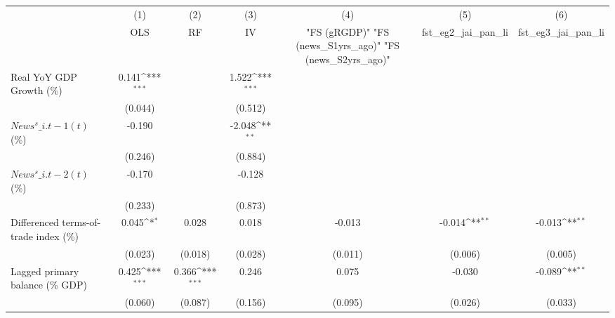 {
\def\sym#1{\ifmmode^{#1}\else\(^{#1}\)\fi}
\begin{tabular}{l*{6}{c}}
\toprule
                    &\multicolumn{1}{c}{(1)}&\multicolumn{1}{c}{(2)}&\multicolumn{1}{c}{(3)}&\multicolumn{1}{c}{(4)}&\multicolumn{1}{c}{(5)}&\multicolumn{1}{c}{(6)}\\
                    &\multicolumn{1}{c}{OLS}&\multicolumn{1}{c}{RF}&\multicolumn{1}{c}{IV}&\multicolumn{1}{c}{ "FS (gRGDP)"  "FS (news\_S1yrs\_ago)"  "FS (news\_S2yrs\_ago)" }&\multicolumn{1}{c}{fst\_eg2\_jai\_pan\_li}&\multicolumn{1}{c}{fst\_eg3\_jai\_pan\_li}\\
\midrule
Real YoY GDP Growth (\%)&       0.141\sym{***}&                     &       1.522\sym{***}&                     &                     &                     \\
                    &     (0.044)         &                     &     (0.512)         &                     &                     &                     \\
\addlinespace
$ News^s\_{i.t-1}(t)$ (\%)&      -0.190         &                     &      -2.048\sym{**} &                     &                     &                     \\
                    &     (0.246)         &                     &     (0.884)         &                     &                     &                     \\
\addlinespace
$ News^s\_{i.t-2}(t)$ (\%)&      -0.170         &                     &      -0.128         &                     &                     &                     \\
                    &     (0.233)         &                     &     (0.873)         &                     &                     &                     \\
\addlinespace
Differenced terms-of-trade index (\%)&       0.045\sym{*}  &       0.028         &       0.018         &      -0.013         &      -0.014\sym{**} &      -0.013\sym{**} \\
                    &     (0.023)         &     (0.018)         &     (0.028)         &     (0.011)         &     (0.006)         &     (0.005)         \\
\addlinespace
Lagged primary balance (\% GDP)&       0.425\sym{***}&       0.366\sym{***}&       0.246         &       0.075         &      -0.030         &      -0.089\sym{**} \\
                    &     (0.060)         &     (0.087)         &     (0.156)         &     (0.095)         &     (0.026)         &     (0.033)         \\

\end{tabular}}
